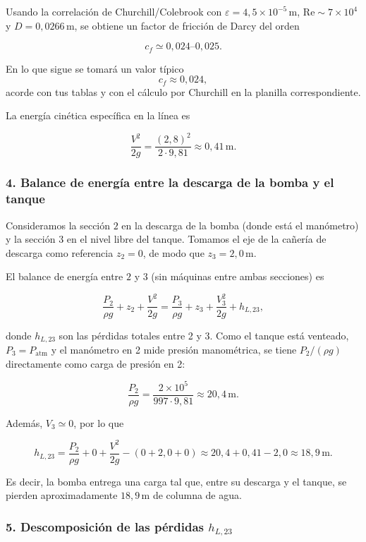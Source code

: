\documentclass[12pt, a4paper]{article}
\begin{document}
Usando la correlación de Churchill/Colebrook con $\varepsilon = 4{,}5\times 10^{-5}\,\text{m}$,
$\text{Re}\sim 7\times 10^4$ y $D=0{,}0266\,\text{m}$, se obtiene un factor de fricción
de Darcy del orden

\[
c_f \simeq 0{,}024\text{--}0{,}025.
\]

En lo que sigue se tomará un valor típico
\[
c_f \approx 0{,}024,
\]
acorde con tus tablas y con el cálculo por Churchill en la planilla correspondiente.

La energía cinética específica en la línea es

\[
\frac{V^2}{2g}
= \frac{(2{,}8)^2}{2\cdot 9{,}81}
\approx 0{,}41\,\text{m}.
\]

\subsubsection*{4. Balance de energía entre la descarga de la bomba y el tanque}

Consideramos la sección $2$ en la descarga de la bomba (donde está el manómetro) 
y la sección $3$ en el nivel libre del tanque. Tomamos el eje de la cañería de descarga
como referencia $z_2 = 0$, de modo que $z_3 = 2{,}0\,\text{m}$.

El balance de energía entre $2$ y $3$ (sin máquinas entre ambas secciones) es

\[
\frac{P_2}{\rho g} + z_2 + \frac{V^2}{2g}
=
\frac{P_3}{\rho g} + z_3 + \frac{V_3^2}{2g} + h_{L,23},
\]

donde $h_{L,23}$ son las pérdidas totales entre 2 y 3. Como el tanque está venteado,
$P_3 = P_{\text{atm}}$ y el manómetro en 2 mide presión manométrica, se tiene
$P_2/(\rho g)$ directamente como carga de presión en 2:

\[
\frac{P_2}{\rho g}
= \frac{2\times 10^5}{997\cdot 9{,}81}
\approx 20{,}4\,\text{m}.
\]

Además, $V_3 \simeq 0$, por lo que

\[
h_{L,23}
= \frac{P_2}{\rho g} + 0 + \frac{V^2}{2g}
- \left(0 + 2{,}0 + 0\right)
\approx 20{,}4 + 0{,}41 - 2{,}0
\approx 18{,}9\,\text{m}.
\]

Es decir, la bomba entrega una carga tal que, entre su descarga y el tanque,
se pierden aproximadamente $18{,}9\,\text{m}$ de columna de agua.

\subsubsection*{5. Descomposición de las pérdidas $h_{L,23}$}
\end{document}
